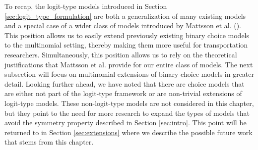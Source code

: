 To recap, the logit-type models introduced in Section \ref{sec:logit_type_formulation} are both a generalization of many existing models and a special case of a wider class of models introduced by Mattsson et al. (\citeyear{mattsson_extreme_2014}). This position allows us to easily extend previously existing binary choice models to the multinomial setting, thereby making them more useful for transportation researchers. Simultaneously, this position allows us to rely on the theoretical justifications that Mattsson et al. provide for our entire class of models. The next subsection will focus on multinomial extensions of binary choice models in greater detail. Looking further ahead, we have noted that there are choice models that are either not part of the logit-type framework or are non-trivial extensions of logit-type models. These non-logit-type models are not considered in this chapter, but they point to the need for more research to expand the types of models that avoid the symmetry property described in Section \ref{sec:intro}. This point will be returned to in Section \ref{sec:extensions} where we describe the possible future work that stems from this chapter.

